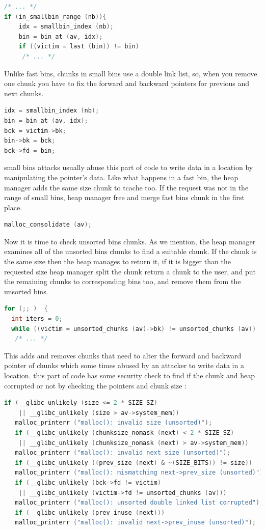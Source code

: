 \documentclass{masterthesis}
\newcommand*\tch{tcache}
\newcommand*\fb{fast bins}
\newcommand*\ub{unsorted bins}
\newcommand*\sbs{small bins}
\begin{document}
\begin{lstlisting}[language=c,frame=tlrb]
 /* ... */ 
if (in_smallbin_range (nb)){
	idx = smallbin_index (nb);
	bin = bin_at (av, idx);
	if ((victim = last (bin)) != bin)
	 /* ... */ 
\end{lstlisting}

Unlike \fb{}, chunks in \sbs{} use a double link list, so, when you remove one chunk you have to fix the forward and backward pointers for previous and next chunks. 

\begin{lstlisting}[language=c,frame=tlrb]
idx = smallbin_index (nb);
bin = bin_at (av, idx);
bck = victim->bk;
bin->bk = bck;
bck->fd = bin;
\end{lstlisting}

\sbs{} attacks usually abuse this part of code to write data in a location by manipulating the pointer's data. Like what happens in a fast bin, the heap manager adds the same size chunk to \tch{} too. If the request was not in the range of \sbs{}, heap manager free and merge \fb{} chunk in the first place.
\begin{lstlisting}[language=c,frame=tlrb]
malloc_consolidate (av);
\end{lstlisting}

Now it is time to check \ub{} chunks. As we mention, the heap manager examines all of the \ub{} chunks to find a suitable chunk. If the chunk is the same size then the heap manages to return it, if it is bigger than the requested size heap manager split the chunk return a chunk to the user, and put the remaining chunks to corresponding bins too, and remove them from the \ub{}.

\begin{lstlisting}[language=c]
for (;; )  {
  int iters = 0;
  while ((victim = unsorted_chunks (av)->bk) != unsorted_chunks (av))
   /* ... */ 
\end{lstlisting}
This adds and removes chunks that need to alter the forward and backward pointer of chunks which some times abused by an attacker to write data in a location. this part of code has some security check to find if the chunk and heap corrupted or not by checking the pointers and chunk size :
\begin{lstlisting}[language=c,frame=tlrb]
   if (__glibc_unlikely (size <= 2 * SIZE_SZ)
    || __glibc_unlikely (size > av->system_mem))
   malloc_printerr ("malloc(): invalid size (unsorted)");
   if (__glibc_unlikely (chunksize_nomask (next) < 2 * SIZE_SZ)
    || __glibc_unlikely (chunksize_nomask (next) > av->system_mem))
   malloc_printerr ("malloc(): invalid next size (unsorted)");
   if (__glibc_unlikely ((prev_size (next) & ~(SIZE_BITS)) != size))
   malloc_printerr ("malloc(): mismatching next->prev_size (unsorted)");
   if (__glibc_unlikely (bck->fd != victim)
    || __glibc_unlikely (victim->fd != unsorted_chunks (av)))
   malloc_printerr ("malloc(): unsorted double linked list corrupted");
   if (__glibc_unlikely (prev_inuse (next)))
   malloc_printerr ("malloc(): invalid next->prev_inuse (unsorted)");
\end{lstlisting}
\end{document}
